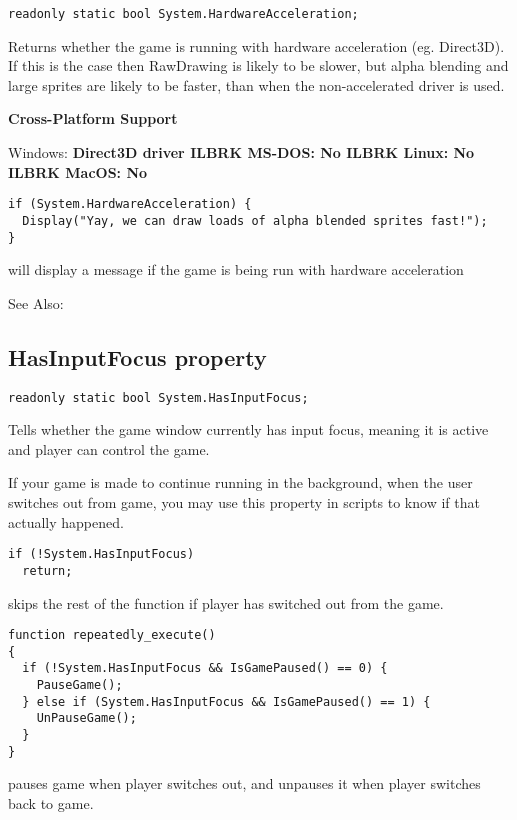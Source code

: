 \begin{verbatim}
readonly static bool System.HardwareAcceleration;
\end{verbatim}
Returns whether the game is running with hardware acceleration (eg. Direct3D). If this is
the case then RawDrawing is likely to be slower, but alpha blending and large sprites are
likely to be faster, than when the non-accelerated driver is used.

\bf{Cross-Platform Support}

Windows: \bf{ Direct3D driver }ILBRK
MS-DOS: \bf{ No }ILBRK
Linux: \bf{ No }ILBRK
MacOS: \bf{ No }

\begin{verbatim}
if (System.HardwareAcceleration) {
  Display("Yay, we can draw loads of alpha blended sprites fast!");
}
\end{verbatim}
will display a message if the game is being run with hardware acceleration

See Also: 


\subsection{HasInputFocus property}\label{System.HasInputFocus}%

\begin{verbatim}
readonly static bool System.HasInputFocus;
\end{verbatim}
Tells whether the game window currently has input focus, meaning it is active and player can control the game.

If your game is made to continue running in the background, when the user switches out from game, you may use this property in scripts to know if that actually happened.

\begin{verbatim}
if (!System.HasInputFocus)
  return;
\end{verbatim}
skips the rest of the function if player has switched out from the game.

\begin{verbatim}
function repeatedly_execute()
{
  if (!System.HasInputFocus && IsGamePaused() == 0) {
    PauseGame();
  } else if (System.HasInputFocus && IsGamePaused() == 1) {
    UnPauseGame();
  }
}
\end{verbatim}
pauses game when player switches out, and unpauses it when player switches back to game.

